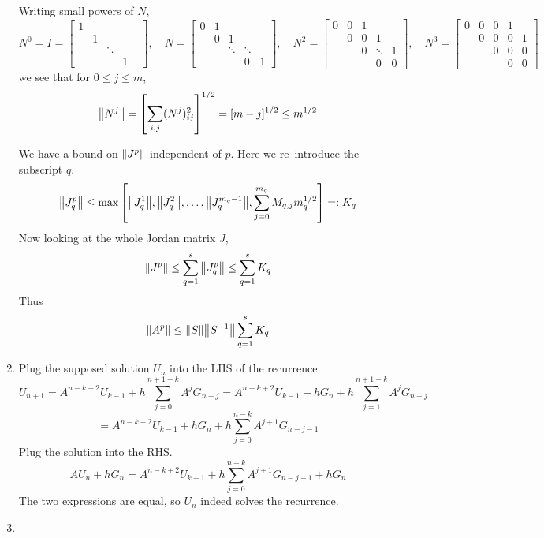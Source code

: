 \documentclass{article}
\newcommand{\sbr}[1]{\left[#1\right]}
\newcommand{\m}[2][b]{\begin{#1matrix}#2\end{#1matrix}}
\newcommand{\inv}{^{-1}}
\begin{document}
\begin{enumerate}
Writing small powers of $N$,
$$N^0 = I = \m{
	1 &  & & \\
	& 1 &  & & \\
	& & \ddots &  \\
	& & & 1 & 
},
\quad N = \m{
	0 & 1 & & \\
	& 0 & 1 & & \\
	& & \ddots & \ddots \\
	& & & 0 & 1
},
\quad N^2 = \m{
	0 & 0 & 1 & \\
	& 0 & 0 & 1 & \\
	& & 0 & \ddots & 1 \\
	& & & 0 & 0
},
\quad N^3 = \m{
	0 & 0 & 0 & 1 \\
	& 0 & 0 & 0 & 1 \\
	& & 0 & 0 & 0 \\
	& & & 0 & 0
}
$$
we see that for $0\le j\le m$,
$$\norm{N^j} = \sbr{\sum_{i,j}(N^j)_{ij}^2}^{1/2} = [m-j]^{1/2} \le m^{1/2}$$

We have a bound on $\norm{J^p}$ independent of $p$. Here we re--introduce the subscript $q$.
$$\norm{J_q^p} \le \max\sbr{\norm{J_q^1},\norm{J_q^2},\dots,\norm{J_q^{m_q-1}},\sum_{j=0}^{m_q} M_{q,j} m_q^{1/2}} =: K_q$$
Now looking at the whole Jordan matrix $J$,
$$\norm{J^p} \le \sum_{q=1}^s \norm{J_q^p} \le \sum_{q=1}^s K_q$$
Thus
$$\norm{A^p} \le \norm{S}\norm{S\inv} \sum_{q=1}^s K_q$$



\item Plug the supposed solution $U_n$ into the LHS of the recurrence.
$$U_{n+1} = A^{n-k+2}U_{k-1} + h\sum_{j=0}^{n+1-k}A^jG_{n-j}
= A^{n-k+2}U_{k-1} + hG_n + h\sum_{j=1}^{n+1-k}A^jG_{n-j}$$
$$= A^{n-k+2}U_{k-1} + hG_n + h\sum_{j=0}^{n-k}A^{j+1}G_{n-j-1}$$
Plug the solution into the RHS.
$$AU_n + hG_n = A^{n-k+2}U_{k-1} + h\sum_{j=0}^{n-k}A^{j+1}G_{n-j-1} + hG_n$$
The two expressions are equal, so $U_n$ indeed solves the recurrence.



\item

\begin{enumerate}[label=(\alph*)]
	

\end{enumerate}
\end{enumerate}
\end{document}
